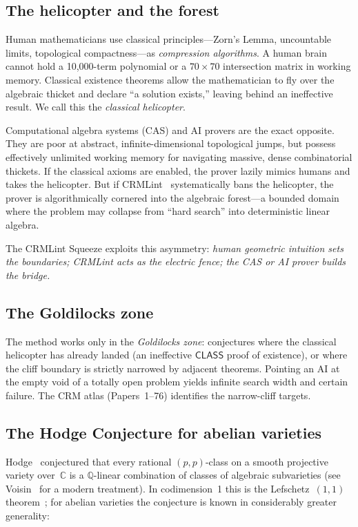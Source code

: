 \documentclass[11pt]{article}
\theoremstyle{plain}
\theoremstyle{definition}
\theoremstyle{remark}
\newcommand{\Q}{\mathbb{Q}}
\newcommand{\C}{\mathbb{C}}
\newcommand{\CLASS}{\mathsf{CLASS}}
\begin{document}
\subsection{The helicopter and the forest}

Human mathematicians use classical principles---Zorn's Lemma,
uncountable limits, topological compactness---as \emph{compression
algorithms}.  A human brain cannot hold a 10,000-term polynomial
or a $70 \times 70$ intersection matrix in working memory.
Classical existence theorems allow the mathematician to fly over
the algebraic thicket and declare ``a solution exists,'' leaving
behind an ineffective result.  We call this the \emph{classical
helicopter}.

Computational algebra systems (CAS) and AI provers are the exact
opposite.  They are poor at abstract, infinite-dimensional
topological jumps, but possess effectively unlimited working memory
for navigating massive, dense combinatorial thickets.  If the
classical axioms are enabled, the prover lazily mimics humans and
takes the helicopter.  But if CRMLint~\cite{Paper76} systematically
bans the helicopter, the prover is algorithmically cornered into the
algebraic forest---a bounded domain where the problem may collapse
from ``hard search'' into deterministic linear algebra.

The CRMLint Squeeze exploits this asymmetry: \emph{human geometric
intuition sets the boundaries; CRMLint acts as the electric fence;
the CAS or AI prover builds the bridge.}

\subsection{The Goldilocks zone}

The method works only in the \emph{Goldilocks zone}: conjectures
where the classical helicopter has already landed (an ineffective
$\CLASS$ proof of existence), or where the cliff boundary is
strictly narrowed by adjacent theorems.  Pointing an AI at the
empty void of a totally open problem yields infinite search width
and certain failure.  The CRM atlas (Papers~1--76)
identifies the narrow-cliff targets.

\subsection{The Hodge Conjecture for abelian varieties}

Hodge~\cite{Hodge1950} conjectured that every rational
$(p,p)$-class on a smooth projective variety over~$\C$ is a
$\Q$-linear combination of classes of algebraic subvarieties
(see Voisin~\cite{Voisin2002} for a modern treatment).
In codimension~1 this is the Lefschetz~$(1,1)$
theorem~\cite{Lefschetz1924}; for abelian varieties the conjecture
is known in considerably greater generality:
\end{document}
